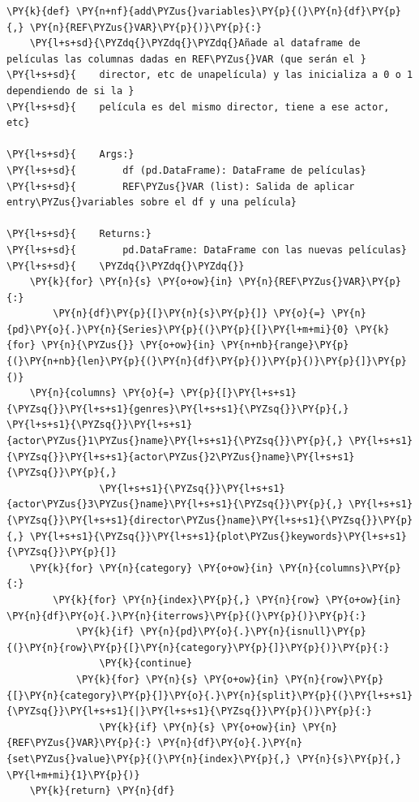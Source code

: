     \begin{tcolorbox}[breakable, size=fbox, boxrule=1pt, pad at break*=1mm,colback=cellbackground, colframe=cellborder]
\begin{Verbatim}[commandchars=\\\{\}]
\PY{k}{def} \PY{n+nf}{add\PYZus{}variables}\PY{p}{(}\PY{n}{df}\PY{p}{,} \PY{n}{REF\PYZus{}VAR}\PY{p}{)}\PY{p}{:}
    \PY{l+s+sd}{\PYZdq{}\PYZdq{}\PYZdq{}Añade al dataframe de películas las columnas dadas en REF\PYZus{}VAR (que serán el }
\PY{l+s+sd}{    director, etc de unapelícula) y las inicializa a 0 o 1 dependiendo de si la }
\PY{l+s+sd}{    película es del mismo director, tiene a ese actor, etc}

\PY{l+s+sd}{    Args:}
\PY{l+s+sd}{        df (pd.DataFrame): DataFrame de películas}
\PY{l+s+sd}{        REF\PYZus{}VAR (list): Salida de aplicar entry\PYZus{}variables sobre el df y una película}

\PY{l+s+sd}{    Returns:}
\PY{l+s+sd}{        pd.DataFrame: DataFrame con las nuevas películas}
\PY{l+s+sd}{    \PYZdq{}\PYZdq{}\PYZdq{}}
    \PY{k}{for} \PY{n}{s} \PY{o+ow}{in} \PY{n}{REF\PYZus{}VAR}\PY{p}{:} 
        \PY{n}{df}\PY{p}{[}\PY{n}{s}\PY{p}{]} \PY{o}{=} \PY{n}{pd}\PY{o}{.}\PY{n}{Series}\PY{p}{(}\PY{p}{[}\PY{l+m+mi}{0} \PY{k}{for} \PY{n}{\PYZus{}} \PY{o+ow}{in} \PY{n+nb}{range}\PY{p}{(}\PY{n+nb}{len}\PY{p}{(}\PY{n}{df}\PY{p}{)}\PY{p}{)}\PY{p}{]}\PY{p}{)}
    \PY{n}{columns} \PY{o}{=} \PY{p}{[}\PY{l+s+s1}{\PYZsq{}}\PY{l+s+s1}{genres}\PY{l+s+s1}{\PYZsq{}}\PY{p}{,} \PY{l+s+s1}{\PYZsq{}}\PY{l+s+s1}{actor\PYZus{}1\PYZus{}name}\PY{l+s+s1}{\PYZsq{}}\PY{p}{,} \PY{l+s+s1}{\PYZsq{}}\PY{l+s+s1}{actor\PYZus{}2\PYZus{}name}\PY{l+s+s1}{\PYZsq{}}\PY{p}{,}
                \PY{l+s+s1}{\PYZsq{}}\PY{l+s+s1}{actor\PYZus{}3\PYZus{}name}\PY{l+s+s1}{\PYZsq{}}\PY{p}{,} \PY{l+s+s1}{\PYZsq{}}\PY{l+s+s1}{director\PYZus{}name}\PY{l+s+s1}{\PYZsq{}}\PY{p}{,} \PY{l+s+s1}{\PYZsq{}}\PY{l+s+s1}{plot\PYZus{}keywords}\PY{l+s+s1}{\PYZsq{}}\PY{p}{]}
    \PY{k}{for} \PY{n}{category} \PY{o+ow}{in} \PY{n}{columns}\PY{p}{:}
        \PY{k}{for} \PY{n}{index}\PY{p}{,} \PY{n}{row} \PY{o+ow}{in} \PY{n}{df}\PY{o}{.}\PY{n}{iterrows}\PY{p}{(}\PY{p}{)}\PY{p}{:}
            \PY{k}{if} \PY{n}{pd}\PY{o}{.}\PY{n}{isnull}\PY{p}{(}\PY{n}{row}\PY{p}{[}\PY{n}{category}\PY{p}{]}\PY{p}{)}\PY{p}{:} 
                \PY{k}{continue}
            \PY{k}{for} \PY{n}{s} \PY{o+ow}{in} \PY{n}{row}\PY{p}{[}\PY{n}{category}\PY{p}{]}\PY{o}{.}\PY{n}{split}\PY{p}{(}\PY{l+s+s1}{\PYZsq{}}\PY{l+s+s1}{|}\PY{l+s+s1}{\PYZsq{}}\PY{p}{)}\PY{p}{:}
                \PY{k}{if} \PY{n}{s} \PY{o+ow}{in} \PY{n}{REF\PYZus{}VAR}\PY{p}{:} \PY{n}{df}\PY{o}{.}\PY{n}{set\PYZus{}value}\PY{p}{(}\PY{n}{index}\PY{p}{,} \PY{n}{s}\PY{p}{,} \PY{l+m+mi}{1}\PY{p}{)}            
    \PY{k}{return} \PY{n}{df}
\end{Verbatim}
\end{tcolorbox}

